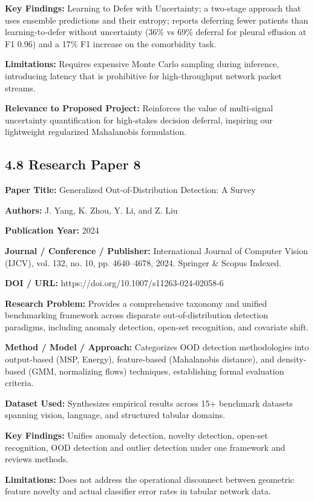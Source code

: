 \textbf{Key Findings:} Learning to Defer with Uncertainty; a two-stage approach that uses ensemble predictions and their entropy; reports deferring fewer patients than learning-to-defer without uncertainty (36\% vs 69\% deferral for pleural effusion at F1 0.96) and a 17\% F1 increase on the comorbidity task.

\textbf{Limitations:} Requires expensive Monte Carlo sampling during inference, introducing latency that is prohibitive for high-throughput network packet streams.

\textbf{Relevance to Proposed Project:} Reinforces the value of multi-signal uncertainty quantification for high-stakes decision deferral, inspiring our lightweight regularized Mahalanobis formulation.

\subsection{4.8 Research Paper 8}

\textbf{Paper Title:} Generalized Out-of-Distribution Detection: A Survey

\textbf{Authors:} J. Yang, K. Zhou, Y. Li, and Z. Liu

\textbf{Publication Year:} 2024

\textbf{Journal / Conference / Publisher:} International Journal of Computer Vision (IJCV), vol. 132, no. 10, pp. 4640--4678, 2024. Springer \& Scopus Indexed.

\textbf{DOI / URL:} https://doi.org/10.1007/s11263-024-02058-6

\textbf{Research Problem:} Provides a comprehensive taxonomy and unified benchmarking framework across disparate out-of-distribution detection paradigms, including anomaly detection, open-set recognition, and covariate shift.

\textbf{Method / Model / Approach:} Categorizes OOD detection methodologies into output-based (MSP, Energy), feature-based (Mahalanobis distance), and density-based (GMM, normalizing flows) techniques, establishing formal evaluation criteria.

\textbf{Dataset Used:} Synthesizes empirical results across 15+ benchmark datasets spanning vision, language, and structured tabular domains.

\textbf{Key Findings:} Unifies anomaly detection, novelty detection, open-set recognition, OOD detection and outlier detection under one framework and reviews methods.

\textbf{Limitations:} Does not address the operational disconnect between geometric feature novelty and actual classifier error rates in tabular network data.

